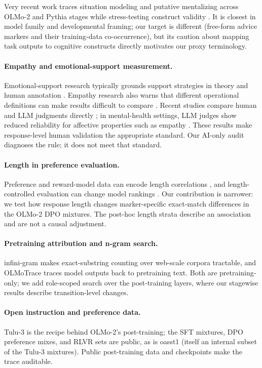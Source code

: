 \documentclass[11pt]{article}
\begin{document}
Very recent work traces situation modeling and putative mentalizing across
OLMo-2 and Pythia stages while stress-testing construct validity
\citep{riviere2026developmental}. It is closest in model family and
developmental framing; our target is different (free-form advice markers and
their training-data co-occurrence), but its caution about mapping task outputs
to cognitive constructs directly motivates our proxy terminology.

\paragraph{Empathy and emotional-support measurement.}
Emotional-support research typically grounds support strategies in theory and
human annotation \citep{liu2021emotional}. Empathy research also warns that
different operational definitions can make results difficult to compare
\citep{lahnala2022critical}. Recent studies compare human and LLM judgments
directly \citep{welivita2026empathetic}; in mental-health settings, LLM judges
show reduced reliability for affective properties such as empathy
\citep{badawi2026trust}. These results make response-level human validation the
appropriate standard. Our AI-only audit diagnoses the rule; it does not meet
that standard.

\paragraph{Length in preference evaluation.}
Preference and reward-model data can encode length correlations
\citep{singhal2023long}, and length-controlled evaluation can change model
rankings \citep{dubois2024length}. Our contribution is narrower: we test how
response length changes marker-specific exact-match differences in the OLMo-2
DPO mixtures. The post-hoc length strata describe an association and are not a
causal adjustment.

\paragraph{Pretraining attribution and n-gram search.}
infini-gram \citep{liu2024infinigram} makes exact-substring counting over
web-scale corpora tractable, and OLMoTrace \citep{liu2025olmotrace} traces
model outputs back to pretraining text. Both are pretraining-only; we add
role-scoped search over the post-training layers, where our stagewise results
describe transition-level changes.

\paragraph{Open instruction and preference data.}
Tulu-3 \citep{lambert2024tulu3} is the recipe behind OLMo-2's post-training;
the SFT mixtures, DPO preference mixes, and RLVR sets are public, as is oasst1
\citep{kopf2023oasst1} (itself an internal subset of the Tulu-3 mixtures).
Public post-training data and checkpoints make the trace auditable.
\end{document}
